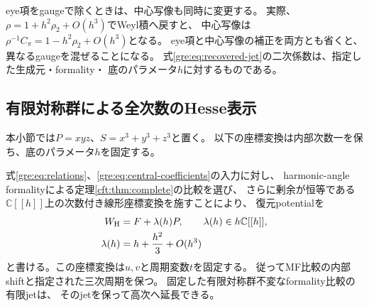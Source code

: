 eye項をgaugeで除くときは、中心写像も同時に変更する。
実際、$\rho=1+h^2\rho_2+O(h^3)$でWeyl積へ戻すと、
中心写像は$\rho^{-1}C_\pi=1-h^2\rho_2+O(h^3)$となる。
eye項と中心写像の補正を両方とも省くと、異なるgaugeを混ぜることになる。
式\eqref{gre:eq:recovered-jet}の二次係数は、指定した生成元・formality・
底のパラメータ$h$に対するものである。

\subsection{有限対称群による全次数のHesse表示}
本小節では$P=xyz$、$S=x^3+y^3+z^3$と置く。
以下の座標変換は内部次数一を保ち、底のパラメータ$h$を固定する。

\begin{proposition}[復元potentialの全次数Hesse表示]
\label{gre:prop:hesse-normalform}
式\eqref{gre:eq:relations}、\eqref{gre:eq:central-coefficients}の入力に対し、
harmonic-angle formalityによる定理\ref{cft:thm:complete}の比較を選び、
さらに剰余が恒等である$\mathbb C[[h]]$上の次数付き線形座標変換を施すことにより、
復元potentialを
\begin{equation}\label{gre:eq:all-order-hesse}
 \begin{aligned}
 W_{\rm H}&=F+\lambda(h)P,\qquad \lambda(h)\in h\mathbb C[[h]],\\
 \lambda(h)&=h+\frac{h^2}{3}+O(h^3)
 \end{aligned}
\end{equation}
と書ける。この座標変換は$u,v$と周期変数$t$を固定する。
従ってMF比較の内部shiftと指定された三次周期を保つ。
固定した有限対称群不変なformality比較の有限jetは、
そのjetを保って高次へ延長できる。
\end{proposition}
